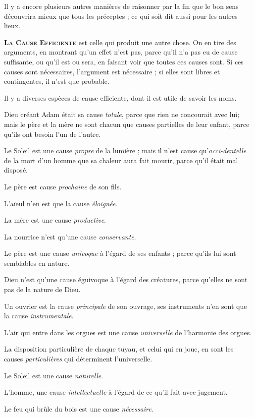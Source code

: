 Il y a encore plusieurs autres manières de raisonner par la fin que le bon sens découvrira mieux que tous les préceptes ; ce qui soit dit aussi pour les autres lieux.

\bigbreak
{\bfseries\scshape La Cause Efficiente} est celle qui produit une autre chose. On en tire des arguments, en montrant qu'un effet n'est pas, parce qu'il n'a pas eu de cause suffisante, ou qu'il est ou sera, en faisant voir que toutes ces causes sont. Si ces causes sont nécessaires, l'argument est nécessaire ; si elles sont libres et contingentes, il n'est que probable.

Il y a diverses espèces de cause efficiente, dont il est utile de savoir les noms.

Dieu créant Adam était sa cause \emph{totale}, parce que rien ne concourait avec lui; mais le père et la mère ne sont chacun que causes partielles de leur enfant, parce qu'ils ont besoin l'un de l'autre.

Le Soleil est une cause \emph{propre} de la lumière ; mais il n'est cause qu'\emph{acci-}\emph{dentelle} de la mort d'un homme que sa chaleur aura fait mourir, parce qu'il était mal disposé.

Le père est cause \emph{prochaine} de son fils.

L'aïeul n'en est que la cause \emph{éloignée}.

La mère est une cause \emph{productive}.

La nourrice n'est qu'une cause \emph{conservante}.

Le père est une cause \emph{univoque} à l'égard de ses enfants ; parce qu'ils lui sont semblables en nature.

Dieu n'est qu'une cause éguivoque à l'égard des créatures, parce qu'elles ne sont pas de la nature de Dieu.

Un ouvrier est la cause \emph{principale} de son ouvrage, ses instruments n'en sont que la cause \emph{instrumentale}.

L'air qui entre dans les orgues est une cause \emph{universelle} de l'harmonie des orgues.

La disposition particulière de chaque tuyau, et celui qui en joue, en sont les causes \emph{particulières} qui déterminent l'universelle.

Le Soleil est une cause \emph{naturelle}.

L'homme, une cause \emph{intellectuelle} à l'égard de ce qu'il fait avec jugement.

Le feu qui brûle du bois est une cause \emph{nécessaire}.


